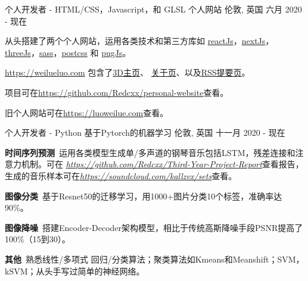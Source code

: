 

\begin{cventries}

  \cventry
    {个人开发者 - HTML/CSS，Javascript，和 GLSL} %
    {个人网站} %
    {伦敦, 英国} %
    {六月 2020 - 现在} %
    {
      \begin{cvitems} %
        \item {从头搭建了两个个人网站，运用各类技术和第三方库如 \href{https://reactjs.org/}{reactJs}，\href{https://nextjs.org/}{nextJs}，\href{https://threejs.org/}{threeJs}，\href{https://sass-lang.com/}{sass}，\href{https://postcss.org/}{postcss} 和 \href{https://pugjs.org/api/getting-started.html}{pugJs}。}
        \item {\href{https://weilueluo.com}{https://weilueluo.com} 包含了\href{https://weilueluo.com}{3D主页}、 \href{https://weilueluo.com/about.html}{关于页}、以及\href{https://weilueluo.com/rss.html}{RSS提要页}。}
        \item {项目可在\href{https://github.com/Redcxx/personal-website}{https://github.com/Redcxx/personal-website}查看。}
        \item {旧个人网站可在\href{https://luoweilue.com}{https://luoweilue.com}查看。}
      \end{cvitems}
    }
    
  \cventry
    {个人开发者 - Python} %
    {基于Pytorch的机器学习} %
    {伦敦, 英国} %
    {十一月 2020 - 现在} %
    {
      \begin{cvitems} %
      \item {\textbf{时间序列预测}\, 运用各类模型生成单/多声道的钢琴音乐包括LSTM，残差连接和注意力机制。可在 \href{https://github.com/Redcxx/Third-Year-Project-Report}{\textit{https://github.com/Redcxx/Third-Year-Project-Report}}查看报告，生成的音乐样本可在\href{https://soundcloud.com/kallzvx/sets}{\textit{https://soundcloud.com/kallzvx/sets}}查看。}
      \item {\textbf{图像分类}\, 基于Resnet50的迁移学习，用1000+图片分类10个标签，准确率达90\%。}
      \item {\textbf{图像降噪}\, 搭建Encoder-Decoder架构模型，相比于传统高斯降噪手段PSNR提高了100\%（15到30）。}
      \item {\textbf{其他}\, 熟悉线性/多项式 回归/分类算法；聚类算法如Kmeans和Meanshift；SVM，kSVM；从头手写过简单的神经网络。}
      \end{cvitems}
    }
    

\end{cventries}
